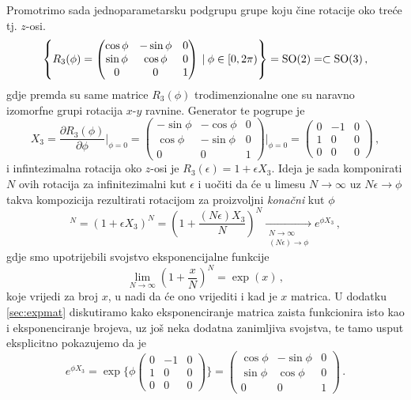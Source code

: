 Promotrimo sada jednoparametarsku podgrupu grupe  koju čine
rotacije oko treće tj. $z$-osi.
\begin{displaymath}
\left\{ R_3 (\phi) = 
\begin{pmatrix}
\cos\phi & -\sin\phi & 0 \\
\sin\phi & \cos\phi & 0 \\
0 & 0 & 1 
\end{pmatrix}
 \: | \: \phi \in [0, 2\pi) \right\} = \mathrm{SO}(2) = \subset \mathrm{SO}(3) \,,
\end{displaymath}
gdje premda su same matrice $R_3 (\phi)$ trodimenzionalne one su
naravno izomorfne grupi  rotacija $x$-$y$ ravnine.
Generator te pogrupe je
\begin{equation} \label{eq:x3so3}
X_3 = \frac{\partial R_3 (\phi)}{\partial \phi}\Bigg|_{\phi=0}=
\begin{pmatrix}
-\sin\phi & -\cos\phi & 0 \\
\cos\phi & -\sin\phi & 0 \\
0 & 0 & 1 
\end{pmatrix}\Bigg|_{\phi=0} =
\begin{pmatrix}
0 & -1 & 0 \\
1 & 0 & 0 \\
0 & 0 & 0 
\end{pmatrix} \,,
\end{equation}
i infintezimalna rotacija oko $z$-osi je $R_3 (\epsilon) = 1 + \epsilon X_3$.
Ideja je sada komponirati $N$ ovih rotacija za infinitezimalni kut
$\epsilon$ i uočiti da
će u limesu $N \to\infty$ uz $N\epsilon \to \phi$ 
takva kompozicija rezultirati rotacijom za proizvoljni \emph{konačni}
kut $\phi$
\begin{displaymath}
[R_3(\epsilon)]^{N} = (1+\epsilon X_3)^N = \left(1+\frac{(N\epsilon)X_3}
 {N}\right)^N 
 \xrightarrow[\substack{N \to \infty \\ (N\epsilon) \to \phi}]{}
 e^{\phi X_3} \,,
\end{displaymath}
gdje smo upotrijebili svojstvo eksponencijalne funkcije
\begin{equation}
    \lim_{N\to\infty}\left(1 + \frac{x}{N}\right)^N = \exp(x) \,,
\end{equation}
koje vrijedi za broj $x$,
u nadi da će ono vrijediti i kad je $x$ matrica.
U dodatku \ref{sec:expmat} diskutiramo
kako eksponenciranje matrica zaista funkcionira isto kao i
eksponenciranje brojeva, uz još neka dodatna zanimljiva svojstva,
te tamo usput eksplicitno pokazujemo da je
\begin{equation}
e^{\phi X_3} = \exp\Bigg\{ 
    \phi  \begin{pmatrix}
0 & -1 & 0 \\
1 & 0 & 0 \\
0 & 0 & 0 
\end{pmatrix}\Bigg\} =
\begin{pmatrix}
\cos\phi & -\sin\phi & 0 \\
\sin\phi & \cos\phi & 0 \\
0 & 0 & 1 \end{pmatrix} \,.
\end{equation}
